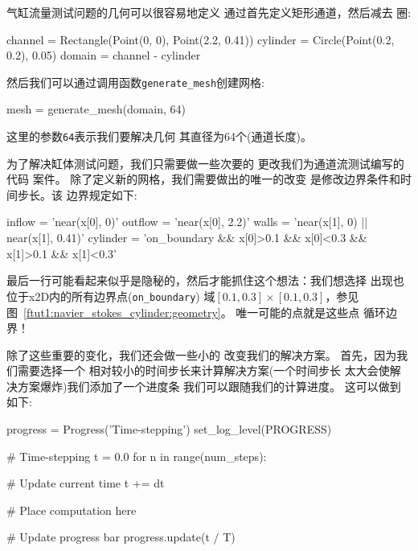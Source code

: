 
气缸流量测试问题的几何可以很容易地定义
通过首先定义矩形通道，然后减去
圈:

\begin{python}
channel = Rectangle(Point(0, 0), Point(2.2, 0.41))
cylinder = Circle(Point(0.2, 0.2), 0.05)
domain = channel - cylinder
\end{python}
然后我们可以通过调用函数\verb!generate_mesh!创建网格:

\begin{python}
mesh = generate_mesh(domain, 64)
\end{python}
这里的参数\texttt{64}表示我们要解决几何
其直径为64个(通道长度)。


为了解决缸体测试问题，我们只需要做一些次要的
更改我们为通道流测试编写的代码
案件。 除了定义新的网格，我们需要做出的唯一的改变
是修改边界条件和时间步长。该
边界规定如下:

\begin{python}
inflow   = 'near(x[0], 0)'
outflow  = 'near(x[0], 2.2)'
walls    = 'near(x[1], 0) || near(x[1], 0.41)'
cylinder = 'on_boundary && x[0]>0.1 && x[0]<0.3 && x[1]>0.1 && x[1]<0.3'
\end{python}
最后一行可能看起来似乎是隐秘的，然后才能抓住这个想法：我们想选择
出现也位于x2D内的所有边界点(\verb!on_boundary!)
域$[0.1,0.3]\times [0.1,0.3]$，参见图~\ref{ftut1:navier_stokes_cylinder:geometry}。
唯一可能的点就是这些点
循环边界！


除了这些重要的变化，我们还会做一些小的
改变我们的解决方案。 首先，因为我们需要选择一个
相对较小的时间步长来计算解决方案(一个时间步长
太大会使解决方案爆炸)我们添加了一个进度条
我们可以跟随我们的计算进度。 这可以做到
如下:


\begin{python}
progress = Progress('Time-stepping')
set_log_level(PROGRESS)

# Time-stepping
t = 0.0
for n in range(num_steps):

    # Update current time
    t += dt

    # Place computation here

    # Update progress bar
    progress.update(t / T)
\end{python}

